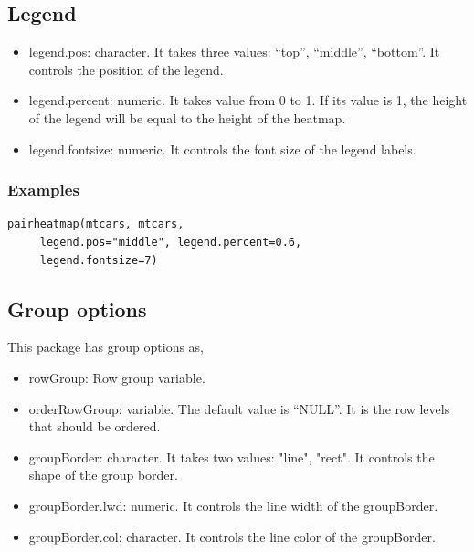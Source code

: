 \documentclass[a4paper]{article}
\begin{document}
\subsection{Legend}
\begin{itemize}
	\item legend.pos: character. It takes three values: ``top'', ``middle'', ``bottom''. It controls the position of the legend.
	\item legend.percent: numeric. It takes value from 0 to 1. If its value is 1, the height of the legend will be equal to the height of the heatmap.
	\item legend.fontsize: numeric. It controls the font size of the legend labels.
\end{itemize}
\subsubsection{Examples}
\begin{verbatim}
pairheatmap(mtcars, mtcars,
     legend.pos="middle", legend.percent=0.6, 
     legend.fontsize=7)
\end{verbatim}
\subsection{Group options}
This package has group options as,\newline
\begin{itemize}
	\item rowGroup: Row group variable.
	\item orderRowGroup: variable. The default value is ``NULL''. It is the row levels that should be ordered.
	\item groupBorder: character. It takes two values: "line", "rect". It controls the shape of the group border.
	\item groupBorder.lwd: numeric. It controls the line width of the groupBorder.
	\item groupBorder.col: character. It controls the line color of the groupBorder.
\end{itemize}
\end{document}
